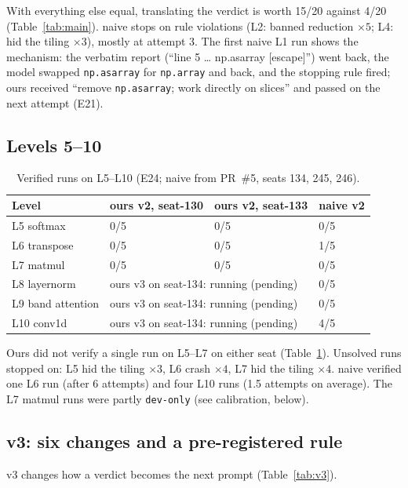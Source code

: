\documentclass[11pt]{article}
\newcommand{\code}[1]{\texttt{#1}}
\newcommand{\E}[1]{E#1}
\begin{document}
With everything else equal, translating the verdict is worth 15/20 against 4/20 (Table~\ref{tab:main}).
naive stops on rule violations (L2: banned reduction $\times5$; L4: hid the tiling $\times3$), mostly at
attempt 3. The first naive L1 run shows the mechanism: the verbatim report (``line 5 \dots{} np.asarray
[escape]'') went back, the model swapped \code{np.asarray} for \code{np.array} and back, and the stopping
rule fired; ours received ``remove \code{np.asarray}; work directly on slices'' and passed on the next
attempt (\E{21}).

\subsection{Levels 5--10}

\begin{table}[h]
\centering
\begin{tabular}{@{}llll@{}}
\toprule
Level & ours v2, seat-130 & ours v2, seat-133 & naive v2 \\
\midrule
L5 softmax & 0/5 & 0/5 & 0/5 \\
L6 transpose & 0/5 & 0/5 & 1/5 \\
L7 matmul & 0/5 & 0/5 & 0/5 \\
L8 layernorm & \multicolumn{2}{l}{ours v3 on seat-134: running (pending)} & 0/5 \\
L9 band attention & \multicolumn{2}{l}{ours v3 on seat-134: running (pending)} & 0/5 \\
L10 conv1d & \multicolumn{2}{l}{ours v3 on seat-134: running (pending)} & 4/5 \\
\bottomrule
\end{tabular}
\caption{Verified runs on L5--L10 (\E{24}; naive from PR~\#5, seats 134, 245, 246).}
\label{tab:l510}
\end{table}

Ours did not verify a single run on L5--L7 on either seat (Table~\ref{tab:l510}). Unsolved runs stopped
on: L5 hid the tiling $\times3$, L6 crash $\times4$, L7 hid the tiling $\times4$. naive verified one L6
run (after 6 attempts) and four L10 runs (1.5 attempts on average). The L7 matmul runs were partly \code{dev-only} (see calibration, below).

\subsection{v3: six changes and a pre-registered rule}
v3 changes how a verdict becomes the next prompt (Table~\ref{tab:v3}).
\end{document}
